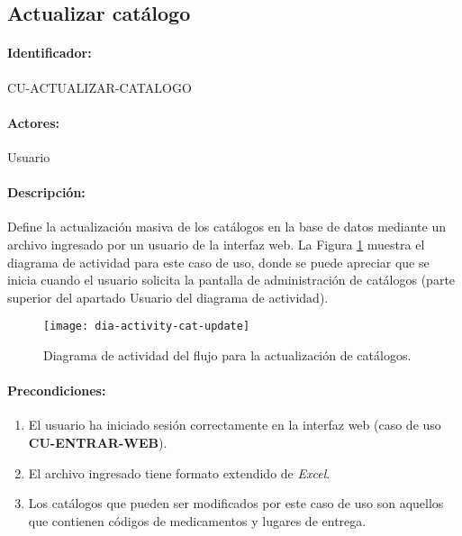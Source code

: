 \subsection{Actualizar catálogo}\label{cu-actualizar-catalogo}
\paragraph{Identificador:}
CU-ACTUALIZAR-CATALOGO
\paragraph{Actores:}
Usuario
\paragraph{Descripción:}
Define la actualización masiva de los catálogos en la base de datos mediante un archivo ingresado por un usuario de la interfaz web. La Figura \ref{fig:dia-activity-cat-update} muestra el diagrama de actividad para este caso de uso, donde se puede apreciar que se inicia cuando el usuario solicita la pantalla de administración de catálogos (parte superior del apartado Usuario del diagrama de actividad).
\begin{figure}[h]
  \centering
  \texttt{[image: dia-activity-cat-update]}
  \caption{Diagrama de actividad del flujo para la actualización de catálogos.}
  \label{fig:dia-activity-cat-update}
\end{figure}
\paragraph{Precondiciones:}
\begin{enumerate}
  \item El usuario ha iniciado sesión correctamente en la interfaz web (caso de uso \textbf{CU-ENTRAR-WEB}).
  \item El archivo ingresado tiene formato extendido de \textit{Excel}\textsuperscript{\textcopyright}.
  \item Los catálogos que pueden ser modificados por este caso de uso son aquellos que contienen códigos de medicamentos y lugares de entrega.
\end{enumerate}
